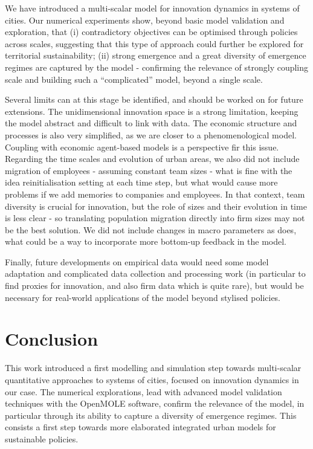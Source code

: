 \documentclass[letterpaper]{article}
\begin{document}
We have introduced a multi-scalar model for innovation dynamics in systems of cities. Our numerical experiments show, beyond basic model validation and exploration, that (i) contradictory objectives can be optimised through policies across scales, suggesting that this type of approach could further be explored for territorial sustainability; (ii) strong emergence and a great diversity of emergence regimes are captured by the model - confirming the relevance of strongly coupling scale and building such a ``complicated'' model, beyond a single scale.

Several limits can at this stage be identified, and should be worked on for future extensions. The unidimensional innovation space is a strong limitation, keeping the model abstract and difficult to link with data. The economic structure and processes is also very simplified, as we are closer to a phenomenological model. Coupling with economic agent-based models is a perspective fir this issue. Regarding the time scales and evolution of urban areas, we also did not include migration of employees - assuming constant team sizes - what is fine with the idea reinitialisation setting at each time step, but what would cause more problems if we add memories to companies and employees. In that context, team diversity is crucial for innovation, but the role of sizes and their evolution in time is less clear \citep{hoisl2017r} - so translating population migration directly into firm sizes may not be the best solution. We did not include changes in macro parameters as \cite{raimbault2021strong} does, what could be a way to incorporate more bottom-up feedback in the model.

Finally, future developments on empirical data would need some model adaptation and complicated data collection and processing work (in particular to find proxies for innovation, and also firm data which is quite rare), but would be necessary for real-world applications of the model beyond stylised policies.

\section{Conclusion}

This work introduced a first modelling and simulation step towards multi-scalar quantitative approaches to systems of cities, focused on innovation dynamics in our case. The numerical explorations, lead with advanced model validation techniques with the OpenMOLE software, confirm the relevance of the model, in particular through its ability to capture a diversity of emergence regimes. This consists a first step towards more elaborated integrated urban models for sustainable policies.



\footnotesize


\end{document}
